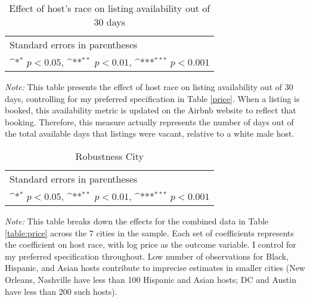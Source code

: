 \documentclass[11pt, oneside]{article}
\begin{document}
\begin{table}[htbp]\centering
	\def\sym#1{\ifmmode^{#1}\else\(^{#1}\)\fi}
	\caption{Effect of host’s race on listing availability out of 30 days}
	\begin{tabular}{l*{1}{c}}
		\hline\hline
		
		\hline\hline
		\multicolumn{2}{l}{\footnotesize Standard errors in parentheses}\\
		\multicolumn{2}{l}{\footnotesize \sym{*} \(p<0.05\), \sym{**} \(p<0.01\), \sym{***} \(p<0.001\)}\\
	\end{tabular}
	
	\begin{tablenotes}
		
		\item {\it Note:} This table presents the effect of host race on listing availability out of 30 days, controlling for my preferred specification in Table \ref{price}. When a listing is booked, this availability metric is updated on the Airbnb website to reflect that booking. Therefore, this measure actually represents the number of days out of the total available days that listings were vacant, relative to a white male host.
	\end{tablenotes}
\end{table}

\newpage
	\begin{table}[htbp]\centering
		\def\sym#1{\ifmmode^{#1}\else\(^{#1}\)\fi}
		\caption{Robustness City}
		\begin{tabular}{l*{7}{c}}
			\hline\hline
			
			\hline\hline
			\multicolumn{8}{l}{\footnotesize Standard errors in parentheses}\\
			\multicolumn{8}{l}{\footnotesize \sym{*} \(p<0.05\), \sym{**} \(p<0.01\), \sym{***} \(p<0.001\)}\\
		\end{tabular}
		\begin{tablenotes}

			\item {\it Note:} This table breaks down the effects for the combined data in Table \ref{table:price} across the 7 cities in the sample. Each set of coefficients represents the coefficient on host race, with log price as the outcome variable. I control for my preferred specification throughout. Low number of observations for Black, Hispanic, and Asian hosts contribute to imprecise estimates in smaller cities (New Orleans, Nashville have less than 100 Hispanic and Asian hosts; DC and Austin have less than 200 such hosts). 
		\end{tablenotes}
	\end{table}
\end{document}

